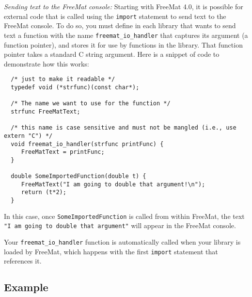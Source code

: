 \emph{Sending text to the FreeMat console:}
Starting with FreeMat 4.0, it is possible for external code that is 
called using the \verb|import| statement to send text to the FreeMat console.
To do so, you must define in each library that wants to send text a 
function with the name \verb|freemat_io_handler| that captures its 
argument (a function pointer), and stores it
for use by functions in the library.  That function pointer takes a 
standard C string argument.  Here is a snippet of code to demonstrate
how this works:
\begin{verbatim}
  /* just to make it readable */
  typedef void (*strfunc)(const char*); 

  /* The name we want to use for the function */
  strfunc FreeMatText;                  

  /* this name is case sensitive and must not be mangled (i.e., use extern "C") */
  void freemat_io_handler(strfunc printFunc) {
     FreeMatText = printFunc;
  }

  double SomeImportedFunction(double t) {
     FreeMatText("I am going to double that argument!\n");
     return (t*2);
  }
\end{verbatim}
In this case, once \verb|SomeImportedFunction| is called from within FreeMat, the
text \verb|"I am going to double that argument"| will appear in the FreeMat console.

Your \verb|freemat_io_handler| function is automatically called when your library is
loaded by FreeMat, which happens with the first \verb|import| statement that references
it.

\subsection{Example}

